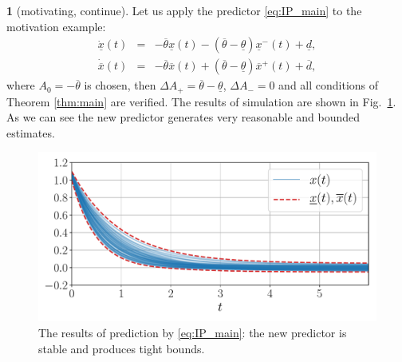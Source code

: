 \documentclass[letterpaper, 10 pt, conference]{ieeeconf}
\theoremstyle{plain}
\theoremstyle{definition}
\newtheorem*{example*}{\protect\examplename}
\theoremstyle{plain}
\theoremstyle{plain}
\theoremstyle{remark}
\providecommand{\examplename}{Example}
\begin{document}
\begin{example*}
[motivating, continue] Let us apply the predictor \eqref{eq:IP_main}
to the motivation example:
\begin{eqnarray*}
\dot{\underline{x}}(t) & = & -\overline{\theta}\underline{x}(t)-(\overline{\theta}-\underline{\theta})\underline{x}^{-}(t)+\underline{d},\\
\dot{\overline{x}}(t) & = & -\overline{\theta}\overline{x}(t)+(\overline{\theta}-\underline{\theta})\overline{x}^{+}(t)+\overline{d},
\end{eqnarray*}
where $A_{0}=-\overline{\theta}$ is chosen, then $\Delta A_{+}=\overline{\theta}-\underline{\theta}$, $\Delta A_{-}=0$ and all conditions of Theorem \ref{thm:main} are verified. The results of simulation are shown in Fig.~\ref{fig:IP_New}. As we can see the new predictor generates very reasonable and bounded estimates. 
\begin{figure}
\begin{centering}
\includegraphics[width=\linewidth]{predictor}
\par\end{centering}
\caption{\label{fig:IP_New} The results of prediction by \eqref{eq:IP_main}: the new predictor is stable and produces tight bounds.}
\end{figure}
\end{example*}
\end{document}
